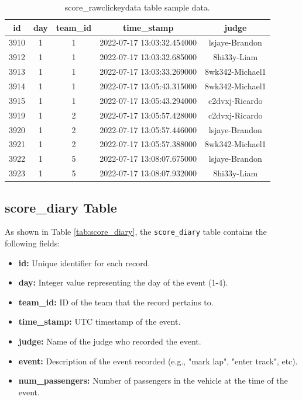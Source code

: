 \documentclass[11pt]{article}
\begin{document}
\begin{table}[H]
    \centering
    \begin{tabular}{|c|c|c|c|c|}
        \hline
        \textbf{id} & \textbf{day} & \textbf{team\_id} & \textbf{time\_stamp}       & \textbf{judge}  \\
        \hline
        3910        & 1            & 1                 & 2022-07-17 13:03:32.454000 & lsjaye-Brandon  \\
        3912        & 1            & 1                 & 2022-07-17 13:03:32.685000 & 8hi33y-Liam     \\
        3913        & 1            & 1                 & 2022-07-17 13:03:33.269000 & 8wk342-Michael1 \\
        3914        & 1            & 1                 & 2022-07-17 13:05:43.315000 & 8wk342-Michael1 \\
        3915        & 1            & 1                 & 2022-07-17 13:05:43.294000 & c2dvxj-Ricardo  \\
        3919        & 1            & 2                 & 2022-07-17 13:05:57.428000 & c2dvxj-Ricardo  \\
        3920        & 1            & 2                 & 2022-07-17 13:05:57.446000 & lsjaye-Brandon  \\
        3921        & 1            & 2                 & 2022-07-17 13:05:57.388000 & 8wk342-Michael1 \\
        3922        & 1            & 5                 & 2022-07-17 13:08:07.675000 & lsjaye-Brandon  \\
        3923        & 1            & 5                 & 2022-07-17 13:08:07.932000 & 8hi33y-Liam     \\
        \hline
    \end{tabular}
    \caption{score\_rawclickeydata table sample data.}
    \label{tab:score_rawclickeydata}
\end{table}

\subsection{score\_diary Table}
As shown in Table \ref{tab:score_diary}, the \texttt{score\_diary} table contains the following fields:

\begin{itemize}
    \item \textbf{id:} Unique identifier for each record.
    \item \textbf{day:} Integer value representing the day of the event (1-4).
    \item \textbf{team\_id:} ID of the team that the record pertains to.
    \item \textbf{time\_stamp:} UTC timestamp of the event.
    \item \textbf{judge:} Name of the judge who recorded the event.
    \item \textbf{event:} Description of the event recorded (e.g., "mark lap", "enter track", etc).
    \item \textbf{num\_passengers:} Number of passengers in the vehicle at the time of the event.
\end{itemize}
\end{document}
